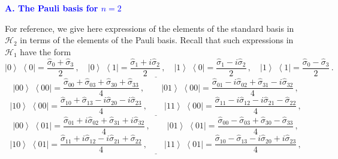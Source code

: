 \documentclass[12pt,a4paper,twoside]{article}      %
\newcommand{\ketbra}[2]{{\ensuremath {\left|#1\right\rangle\!\;\!\!\left\langle#2\right|}}}
\begin{document}
\setcounter{A}{1}

\noindent
{\large\bf{\textcolor{blue}{A. The  Pauli basis for $n=2$}}}\vspace{2ex}

\noindent
For reference, we give here expressions of the elements of the standard basis in $\mathcal{H}_2$ in terms of the elements of the Pauli basis. Recall that such expressions in $\mathcal{H}_1$ have the form
\begin{equation}\label{}
\ketbra00=\frac{\hat{\sigma}_0+ \hat{\sigma}_3}{2}\,, \quad
\ketbra01=\frac{\hat{\sigma}_1+ i\hat{\sigma}_2}{2}\,, \quad
\ketbra10=\frac{\hat{\sigma}_1- i\hat{\sigma}_2}{2}\,, \quad
\ketbra11=\frac{\hat{\sigma}_0- \hat{\sigma}_3}{2}\,.
\nonumber
\end{equation}
$$\underline{\hspace{6cm}}$$\vspace{0.2ex}
\begin{equation}\label{}
\ketbra{00}{00}= \frac{\hat{\sigma}_{00}+ \hat{\sigma}_{03}+ \hat{\sigma}_{30}+ \hat{\sigma}_{33}}{4}\,,
\qquad
\ketbra{01}{00}= \frac{\hat{\sigma}_{01}- i\hat{\sigma}_{02}+ \hat{\sigma}_{31}- i\hat{\sigma}_{32}}{4}\,,
\nonumber
\end{equation}
\begin{equation}\label{}
\ketbra{10}{00}= \frac{\hat{\sigma}_{10}+ \hat{\sigma}_{13}- i\hat{\sigma}_{20}- i\hat{\sigma}_{23}}{4}\,,
\qquad
\ketbra{11}{00}= \frac{\hat{\sigma}_{11}- i\hat{\sigma}_{12}- i\hat{\sigma}_{21}- \hat{\sigma}_{22}}{4}\,,
\nonumber
\end{equation}
$$\underline{\hspace{6cm}}$$\label{A1}\vspace{0.2ex}
\begin{equation}\label{}
\ketbra{00}{01}= \frac{\hat{\sigma}_{01}+ i\hat{\sigma}_{02}+ \hat{\sigma}_{31}+ i\hat{\sigma}_{32}}{4}\,,
\qquad
\ketbra{01}{01}= \frac{\hat{\sigma}_{00}- \hat{\sigma}_{03}+ \hat{\sigma}_{30}- \hat{\sigma}_{33}}{4}\,,
\nonumber
\end{equation}
\begin{equation}\label{}
\ketbra{10}{01}= \frac{\hat{\sigma}_{11}+ i\hat{\sigma}_{12}- i\hat{\sigma}_{21}+ \hat{\sigma}_{22}}{4}\,,
\qquad
\ketbra{11}{01}= \frac{\hat{\sigma}_{10}- \hat{\sigma}_{13}- i\hat{\sigma}_{20}+ i\hat{\sigma}_{23}}{4}\,,
\nonumber
\end{equation}
$$\underline{\hspace{6cm}}$$\vspace{0.2ex}
\end{document}

